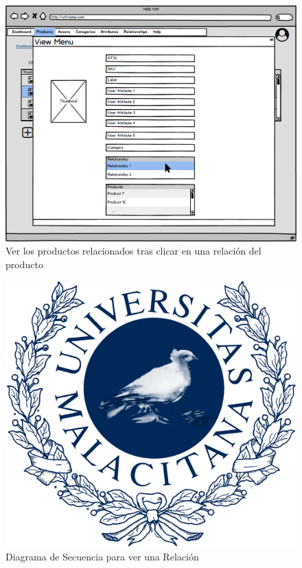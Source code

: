 \begin{figure}[H]
    \includegraphics[width=1\linewidth]{assets/mockups/RF5.2_2.png}
    \caption{Ver los productos relacionados tras clicar en una relación del producto}
   \end{figure}
\vspace{1.0cm}

\newpage %

\begin{figure}[H]
    \includegraphics[width=1\linewidth]{assets/umaLogo.png}
    \caption{Diagrama de Secuencia para ver una Relación}
   \end{figure}
\vspace{1.0cm}

\newpage %
